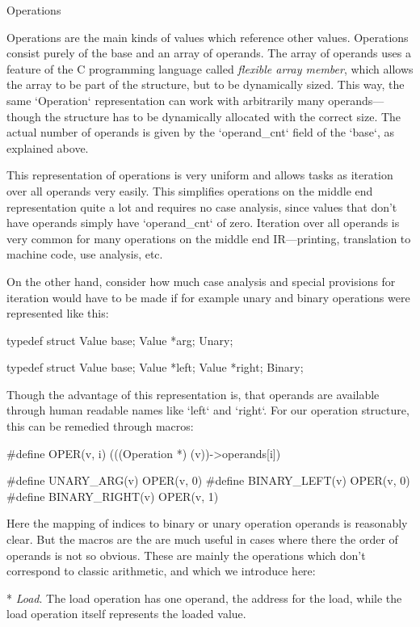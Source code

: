 \seccc Operations

Operations are the main kinds of values which reference other values. Operations
consist
purely of the base and an array of operands. The array of operands uses a
feature of the C programming language called {\em flexible array member}, which
allows the array to be part of the structure, but to be dynamically sized. This
way, the same `Operation` representation can work with arbitrarily many
operands---though the structure has to be dynamically allocated with the correct
size. The actual number of operands is given by the `operand_cnt` field of the
`base`, as explained above.

This representation of operations is very uniform and allows tasks as iteration
over all operands very easily. This simplifies operations on the middle end
representation quite a lot and requires no case analysis, since values that
don't have operands simply have `operand_cnt` of zero. Iteration over all operands is
very common for many operations on the middle end IR---printing, translation to
machine code, use analysis, etc.

On the other hand, consider how much case analysis and special provisions for
iteration would have to be made if for example unary and binary operations were
represented like this:

\begtt
typedef struct {
	Value base;
	Value *arg;
} Unary;

typedef struct {
	Value base;
	Value *left;
	Value *right;
} Binary;
\endtt

Though the advantage of this representation is, that operands are available
through human readable names like `left` and `right`. For our operation
structure, this can be remedied through macros:

\begtt
#define OPER(v, i) (((Operation *) (v))->operands[i])

#define UNARY_ARG(v)     OPER(v, 0)
#define BINARY_LEFT(v)   OPER(v, 0)
#define BINARY_RIGHT(v)  OPER(v, 1)
\endtt

Here the mapping of indices to binary or unary operation operands is reasonably
clear. But the macros are the are much useful in cases where there the order of
operands is not so obvious. These are mainly the operations which don't
correspond to classic arithmetic, and which we introduce here:

\begitems

* {\em Load}. The load operation has one operand, the address for the load,
while the load operation itself represents the loaded value.

